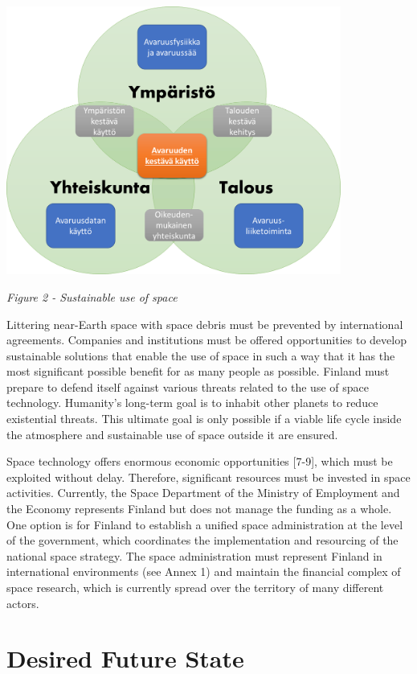 \documentclass[nobib,finnish,oneside,openany,notoc,a4paper]{tufte-book}
\begin{document}
{\includegraphics[width=11cm]{image3.png}

\emph{Figure 2 - Sustainable use of space}

Littering near-Earth space with space debris must be prevented by
international agreements. Companies and institutions must be offered
opportunities to develop sustainable solutions that enable the use of
space in such a way that it has the most significant possible benefit
for as many people as possible. Finland must prepare to defend itself
against various threats related to the use of space technology.
Humanity's long-term goal is to inhabit other planets to reduce
existential threats. This ultimate goal is only possible if a viable
life cycle inside the atmosphere and sustainable use of space outside it
are ensured.

Space technology offers enormous economic opportunities {[}7-9{]}, which
must be exploited without delay. Therefore, significant resources must
be invested in space activities. Currently, the Space Department of the
Ministry of Employment and the Economy represents Finland but does not
manage the funding as a whole. One option is for Finland to establish a
unified space administration at the level of the government, which
coordinates the implementation and resourcing of the national space
strategy. The space administration must represent Finland in
international environments (see Annex 1) and maintain the financial
complex of space research, which is currently spread over the territory
of many different actors.

\chapter{Desired Future State}

}
\end{document}
